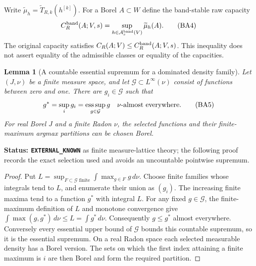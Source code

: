 \documentclass[11pt,a4paper]{article}
\numberwithin{equation}{section}
\newtheorem{lemma}[theorem]{Lemma}
\theoremstyle{definition}
\theoremstyle{remark}
\begin{document}
Write $\widetilde\mu_h=\widetilde T_{R,k}(h^{[k]})$. For a
Borel $A\subset W$ define the band-stable raw capacity
\[
       C_R^{\rm band}(A;V,s)
           =\sup_{h\in\mathcal A_s^{\rm band}(V)}\widetilde\mu_h(A).
 \tag{BA4}
\]
The original capacity satisfies $C_R(A;V)\leq C_R^{\rm band}(A;V,s)$.
This inequality does not assert equality of the admissible classes
or equality of the capacities.

\begin{lemma}[A countable essential supremum for a dominated density family]
\label{lem:r12-countable-essential-supremum}
Let $(J,\nu)$ be a finite measure space, and let
$\mathcal G\subset L^\infty(\nu)$ consist of functions between
zero and one. There are $g_i\in\mathcal G$ such that
\[
                   g^*=\sup_i g_i
                       =\mathop{\rm ess\,sup}_{g\in\mathcal G}g
                                   \quad\nu\text{-almost everywhere}.
 \tag{BA5}
\]
For real Borel $J$ and a finite Radon $\nu$, the selected functions
and their finite-maximum argmax partitions can be chosen Borel.
\end{lemma}

\noindent\textbf{Status: \texttt{EXTERNAL\_KNOWN}} as finite
measure-lattice theory; the following proof records the exact
selection used and avoids an uncountable pointwise supremum.

\begin{proof}
Put $L=\sup_{F\subset\mathcal G\text{ finite}}\int\max_{g\in F}g\,d\nu$.
Choose finite families whose integrals tend to $L$, and enumerate
their union as $(g_i)$. The increasing finite maxima tend to a
function $g^*$ with integral $L$. For any fixed $g\in\mathcal G$,
the finite-maximum definition of $L$ and monotone convergence give
$\int\max(g,g^*)\,d\nu\leq L=\int g^*\,d\nu$.
Consequently $g\leq g^*$ almost everywhere. Conversely every
essential upper bound of $\mathcal G$ bounds this countable
supremum, so it is the essential supremum. On a real Radon space
each selected measurable density has a Borel version. The sets
on which the first index attaining a finite maximum is $i$ are
then Borel and form the required partition.
\end{proof}
\end{document}
